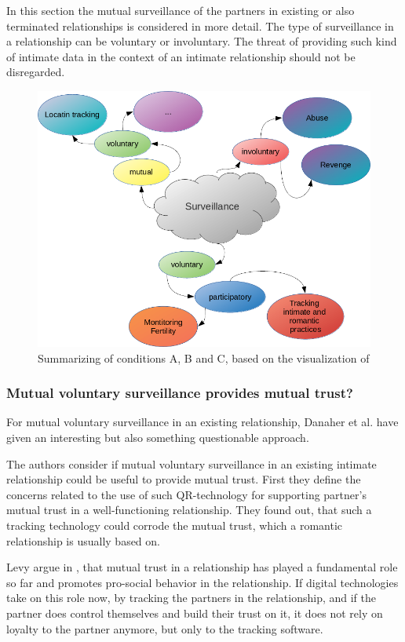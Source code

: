In this section the mutual surveillance of the partners in existing or also terminated relationships is considered in more detail.
The type of surveillance in a relationship can be voluntary or involuntary. The threat of providing such kind of intimate data in the context of an intimate relationship should not be disregarded.
\begin{figure}[htb]
	\centering
	\includegraphics[width=\linewidth]{img/differences_surveillance.png}
	\caption{Summarizing of conditions A, B and C, based on the visualization of \cite{ethicsOfSurveillance}}
	\label{fig:intimate_surveillance}
\end{figure}

\subsubsection{Mutual voluntary surveillance provides mutual trust?}
For mutual voluntary surveillance in an existing relationship, Danaher et al. \cite{doi:10.1080/15265161.2017.1409823} have given an interesting but also something questionable approach.

The authors consider if mutual voluntary surveillance in an existing intimate relationship could be useful to provide mutual trust.
First they define the concerns related to the use of such \acs{QR}-technology for supporting partner's mutual trust in a well-functioning relationship. They found out, that such a tracking technology could corrode the mutual trust, which a romantic relationship is usually based on.

Levy argue in \cite{levy2014intimate}, that mutual trust in a relationship has played a fundamental role so far and promotes pro-social behavior in the relationship. If digital technologies take on this role now, by tracking the partners in the relationship, and if the partner does control themselves and build their trust on it, it does not rely on loyalty to the partner anymore, but only to the tracking software.

